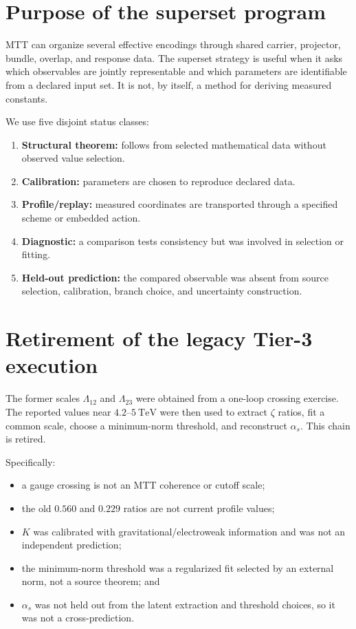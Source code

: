 \documentclass[11pt]{article}
\begin{document}
\section{Purpose of the superset program}

MTT can organize several effective encodings through shared carrier, projector,
bundle, overlap, and response data. The superset strategy is useful when it
asks which observables are jointly representable and which parameters are
identifiable from a declared input set. It is not, by itself, a method for
deriving measured constants.

We use five disjoint status classes:
\begin{enumerate}
\item \textbf{Structural theorem:} follows from selected mathematical data
without observed value selection.
\item \textbf{Calibration:} parameters are chosen to reproduce declared data.
\item \textbf{Profile/replay:} measured coordinates are transported through a
specified scheme or embedded action.
\item \textbf{Diagnostic:} a comparison tests consistency but was involved in
selection or fitting.
\item \textbf{Held-out prediction:} the compared observable was absent from
source selection, calibration, branch choice, and uncertainty construction.
\end{enumerate}

\section{Retirement of the legacy Tier-3 execution}

The former scales $\Lambda_{12}$ and $\Lambda_{23}$ were obtained from a
one-loop crossing exercise. The reported values near $4.2$--$5~\mathrm{TeV}$
were then used to extract $\zeta$ ratios, fit a common scale, choose a
minimum-norm threshold, and reconstruct $\alpha_s$. This chain is retired.

Specifically:
\begin{itemize}
\item a gauge crossing is not an MTT coherence or cutoff scale;
\item the old $0.560$ and $0.229$ ratios are not current profile values;
\item $K$ was calibrated with gravitational/electroweak information and was
not an independent prediction;
\item the minimum-norm threshold was a regularized fit selected by an external
norm, not a source theorem; and
\item $\alpha_s$ was not held out from the latent extraction and threshold
choices, so it was not a cross-prediction.
\end{itemize}
\end{document}
